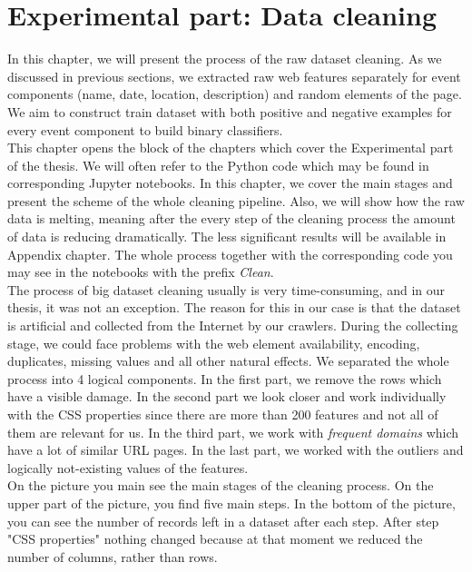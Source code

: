 \chapter{Experimental part: Data cleaning}
\label{chap:clean}
In this chapter, we will present the process of the raw dataset cleaning. As we discussed in previous sections, we extracted raw web features separately for event components (name, date, location, description) and random elements of the page. We aim to construct train dataset with both positive and negative examples for every event component to build binary classifiers. \\

This chapter opens the block of the chapters which cover the Experimental part of the thesis. We will often refer to the Python code which may be found in corresponding Jupyter notebooks. In this chapter, we cover the main stages and present the scheme of the whole cleaning pipeline. Also, we will show how the raw data is melting, meaning after the every step of the cleaning process the amount of data is reducing dramatically. The less significant results will be available in Appendix chapter. The whole process together with the corresponding code you may see in the notebooks with the prefix \textit{Clean}.\\

The process of big dataset cleaning usually is very time-consuming, and in our thesis, it was not an exception. The reason for this in our case is that the dataset is artificial and collected from the Internet by our crawlers. During the collecting stage, we could face problems with the web element availability, encoding, duplicates, missing values and all other natural effects. We separated the whole process into 4 logical components. In the first part, we remove the rows which have a visible damage. In the second part we look closer and work individually with the CSS properties since there are more than 200 features and not all of them are relevant for us. In the third part, we work with \textit{frequent domains} which have a lot of similar URL pages. In the last part, we worked with the outliers and logically not-existing values of the features. \\

On the picture  you main see the main stages of the cleaning process. On the upper part of the picture, you find five main steps. In the bottom of the picture, you can see the number of records left in a dataset after each step. After step "CSS properties" nothing changed because at that moment we reduced the number of columns, rather than rows. 

